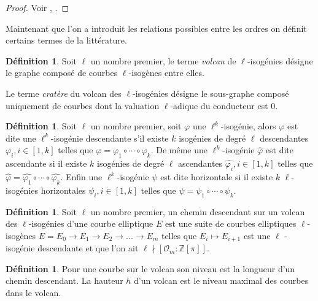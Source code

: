 \documentclass[10pt,a4paper]{book}
\theoremstyle{plain}
\theoremstyle{definition}
\theoremstyle{definition}
\theoremstyle{definition}
\theoremstyle{definition}
\theoremstyle{definition}
\newtheorem{defi}[thm]{Définition}
\theoremstyle{remark}
\theoremstyle{remark}
\theoremstyle{definition}
\begin{document}
\begin{proof}
Voir \cite[§4]{FouquetMorain02}, \cite[Proposition 23]{Kohel96}.
\end{proof}

Maintenant que l'on a introduit les relations possibles entre les ordres on définit certains termes de la littérature.

\begin{defi}
Soit $\ell$ un nombre premier, le terme \emph{volcan} de $\ell$-isogénies 
désigne le graphe composé de courbes $\ell$-isogènes entre elles.

Le terme \emph{cratère} du volcan des $\ell$-isogénies désigne le sous-graphe composé uniquement de courbes dont la valuation $\ell$-adique du conducteur est $0$.
\end{defi}

\begin{defi}
Soit $\ell$ un nombre premier, soit $\varphi$ une $\ell^k$-isogénie, alors
$\varphi$ est dite une $\ell^k$-isogénie descendante s'il existe $k$ 
isogénies de degré $\ell$ descendantes $\varphi_i, i \in [1,k]$ telles que 
$\varphi=\varphi_1 \circ \cdots \circ \varphi_k$. De même une 
$\ell^k$-isogénie $\widehat{\varphi}$ est dite ascendante si il existe $k$ 
isogénies de degré $\ell$ ascendantes $\widehat{\varphi_i}, i \in [1,k]$ 
telles que $\widehat{\varphi}=\widehat{\varphi_1} \circ \cdots \circ 
\widehat{\varphi_k}$. Enfin une $\ell^k$-isogénie $\psi$ est dite horizontale 
si il existe $k$ $\ell$-isogénies horizontales $\psi_i, i \in [1,k]$ telles 
que $\psi=\psi_1 \circ \cdots \circ \psi_k$.
\end{defi}

\begin{defi}
Soit $\ell$ un nombre premier, un chemin descendant sur un volcan des $\ell$-isogénies d'une courbe elliptique $E$ est une suite de courbes elliptiques $\ell$-isogènes $E=E_0 \rightarrow E_1 \rightarrow E_2 \rightarrow ... \rightarrow E_m$ telles que $E_i \mapsto E_{i+1}$ est une $\ell$ -isogénie descendante et que l'on ait $\ell \nmid [ \mathcal{O}_m : \mathbb{Z}[\pi]]$. 
\end{defi}

\begin{defi}
\label{def:haut:vol}
Pour une courbe sur le volcan son niveau est la longueur d'un chemin descendant.
\newline
La hauteur $h$ d'un volcan est le niveau maximal des courbes dans le volcan.
\end{defi}
 
\end{document}
